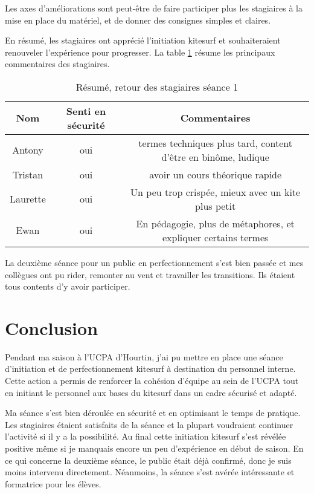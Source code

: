 \documentclass[11pt,a4paper]{report}
\begin{document}
Les axes d'améliorations sont peut-\^etre de faire participer
plus les stagiaires à la mise en place du matériel, et de
donner des consignes simples et claires. 

En résumé, les stagiaires ont apprécié l'initiation kitesurf et
souhaiteraient renouveler l'expérience pour progresser. La table
\ref{stagiaire_feedback} résume les principaux commentaires des stagiaires.

\begin{table}[h]
\begin{tabular}{|c|c|c|}
        \hline
        \textbf{Nom} & \textbf{Senti en sécurité} & \textbf{Commentaires} \\ 
        \hline
       Antony      &  oui    &   termes techniques plus tard, content d’être en binôme, ludique         \\
       \hline
       Tristan     &  oui    & avoir un cours théorique rapide  \\
       \hline
        Laurette   &  oui    & Un peu trop crispée, mieux avec un kite plus petit \\
        \hline
        Ewan       &  oui    & En pédagogie, plus de métaphores, et expliquer certains termes\\
        \hline
\end{tabular}
\caption{Résumé, retour des stagiaires séance 1\label{stagiaire_feedback}}
\end{table}

La deuxième séance pour un public en perfectionnement s'est bien passée et 
mes collègues ont pu rider, remonter au vent et travailler les transitions. Ils étaient tous contents d'y avoir participer.



\FloatBarrier
\section{Conclusion}

Pendant ma saison à l'UCPA d'Hourtin, j'ai pu mettre en place une 
séance d'initiation et de perfectionnement kitesurf à destination 
du personnel interne.
Cette action a permis de renforcer la cohésion d'équipe au sein de l'UCPA
tout en initiant le personnel aux bases du kitesurf dans un cadre 
sécurisé et adapté.

Ma séance s'est bien déroulée en sécurité et en optimisant 
le temps de pratique. Les stagiaires étaient  satisfaits de la 
séance et la plupart voudraient continuer l'activité si il 
y a la possibilité.
Au final cette initiation kitesurf s'est révélée  positive m\^eme si
je manquais encore un peu d'expérience en début de saison.
En ce qui concerne la deuxième séance, le public était déjà confirmé, 
donc je suis moins intervenu directement. Néanmoins, la séance s'est avérée
intéressante et formatrice pour les élèves.
\end{document}
